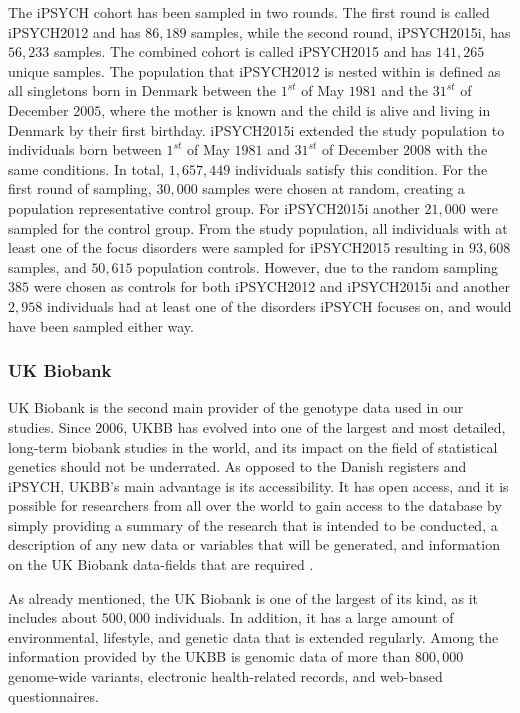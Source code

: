 The iPSYCH cohort has been sampled in two rounds. The first round is called iPSYCH2012 and has $ 86,189 $ samples, while the second round, iPSYCH2015i, has $ 56,233 $ samples. The combined cohort is called iPSYCH2015 and has $ 141,265 $ unique samples. The population that iPSYCH2012 is nested within is defined as all singletons born in Denmark between the $ 1^{st} $ of May $ 1981 $ and the $ 31^{st} $ of December $ 2005 $, where the mother is known and the child is alive and living in Denmark by their first birthday. iPSYCH2015i extended the study population to individuals born between $ 1^{st} $ of May $ 1981 $ and $ 31^{st} $ of December $ 2008 $ with the same conditions. In total, $ 1,657,449 $ individuals satisfy this condition. For the first round of sampling, $ 30,000 $ samples were chosen at random, creating a population representative control group. For iPSYCH2015i another $ 21,000 $ were sampled for the control group. From the study population, all individuals with at least one of the focus disorders were sampled for iPSYCH2015 resulting in $ 93,608 $ samples, and $ 50,615 $ population controls. However, due to the random sampling $ 385 $ were chosen as controls for both iPSYCH2012 and iPSYCH2015i and another $ 2,958 $ individuals had at least one of the disorders iPSYCH focuses on, and would have been sampled either way\cite{pedersen2018ipsych2012,bybjerg2020ipsych2015}.

\subsubsection{UK Biobank}

UK Biobank is the second main provider of the genotype data used in our studies. Since $ 2006 $, UKBB has evolved into one of the largest and most detailed, long-term biobank studies in the world, and its impact on the field of statistical genetics should not be underrated. As opposed to the Danish registers and iPSYCH, UKBB's main advantage is its accessibility. It has open access, and it is possible for researchers from all over the world to gain access to the database by simply providing a summary of the research that is intended to be conducted, a description of any new data or variables that will be generated, and information on the UK Biobank data-fields that are required \cite{bycroft2018uk,biobank2015genotyping}. 

As already mentioned, the UK Biobank is one of the largest of its kind, as it includes about $ 500,000 $ individuals. In addition, it has a large amount of environmental, lifestyle, and genetic data that is extended regularly. Among the information provided by the UKBB is genomic data of more than $ 800,000 $ genome-wide variants, electronic health-related records, and web-based questionnaires. 

